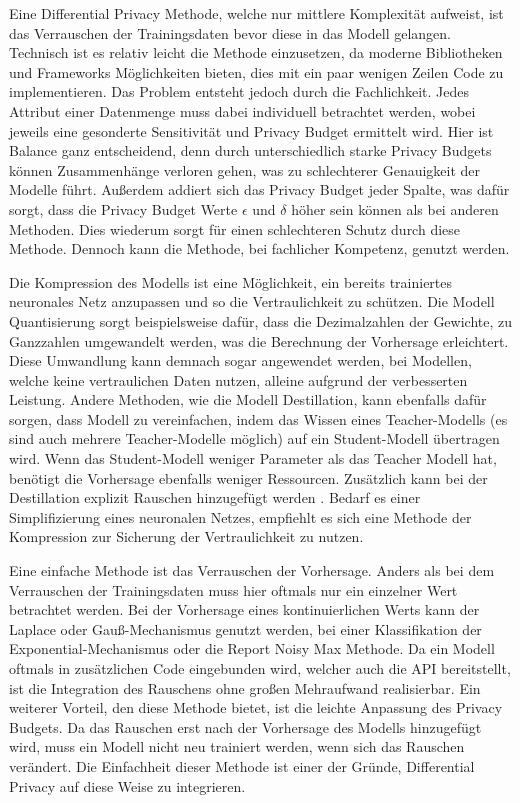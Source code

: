 Eine Differential Privacy Methode, welche nur mittlere Komplexität aufweist, ist das Verrauschen der Trainingsdaten bevor diese in das Modell gelangen.
Technisch ist es relativ leicht die Methode einzusetzen, da moderne Bibliotheken und Frameworks Möglichkeiten bieten, dies mit ein paar wenigen Zeilen Code zu implementieren.
Das Problem entsteht jedoch durch die Fachlichkeit. 
Jedes Attribut einer Datenmenge muss dabei individuell betrachtet werden, wobei jeweils eine gesonderte Sensitivität und Privacy Budget ermittelt wird.
Hier ist Balance ganz entscheidend, denn durch unterschiedlich starke Privacy Budgets können Zusammenhänge verloren gehen, was zu schlechterer Genauigkeit der Modelle führt.
Außerdem addiert sich das Privacy Budget jeder Spalte, was dafür sorgt, dass die Privacy Budget Werte $\epsilon$ und $\delta$ höher sein können als bei anderen Methoden.
Dies wiederum sorgt für einen schlechteren Schutz durch diese Methode.
Dennoch kann die Methode, bei fachlicher Kompetenz, genutzt werden.

Die Kompression des Modells ist eine Möglichkeit, ein bereits trainiertes neuronales Netz anzupassen und so die Vertraulichkeit zu schützen.
Die Modell Quantisierung sorgt beispielsweise dafür, dass die Dezimalzahlen der Gewichte, zu Ganzzahlen umgewandelt werden, was die Berechnung der Vorhersage erleichtert.
Diese Umwandlung kann demnach sogar angewendet werden, bei Modellen, welche keine vertraulichen Daten nutzen, alleine aufgrund der verbesserten Leistung.
Andere Methoden, wie die Modell Destillation, kann ebenfalls dafür sorgen, dass Modell zu vereinfachen, indem das Wissen eines Teacher-Modells (es sind auch mehrere Teacher-Modelle möglich) auf ein Student-Modell übertragen wird.
Wenn das Student-Modell weniger Parameter als das Teacher Modell hat, benötigt die Vorhersage ebenfalls weniger Ressourcen.
Zusätzlich kann bei der Destillation explizit Rauschen hinzugefügt werden \cite{P-64}.
Bedarf es einer Simplifizierung eines neuronalen Netzes, empfiehlt es sich eine Methode der Kompression zur Sicherung der Vertraulichkeit zu nutzen.

Eine einfache Methode ist das Verrauschen der Vorhersage.
Anders als bei dem Verrauschen der Trainingsdaten muss hier oftmals nur ein einzelner Wert betrachtet werden.
Bei der Vorhersage eines kontinuierlichen Werts kann der Laplace oder Gauß-Mechanismus genutzt werden, bei einer Klassifikation der Exponential-Mechanismus oder die Report Noisy Max Methode.
Da ein Modell oftmals in zusätzlichen Code eingebunden wird, welcher auch die API bereitstellt, ist die Integration des Rauschens ohne großen Mehraufwand realisierbar.
Ein weiterer Vorteil, den diese Methode bietet, ist die leichte Anpassung des Privacy Budgets.
Da das Rauschen erst nach der Vorhersage des Modells hinzugefügt wird, muss ein Modell nicht neu trainiert werden, wenn sich das Rauschen verändert.
Die Einfachheit dieser Methode ist einer der Gründe, Differential Privacy auf diese Weise zu integrieren.

